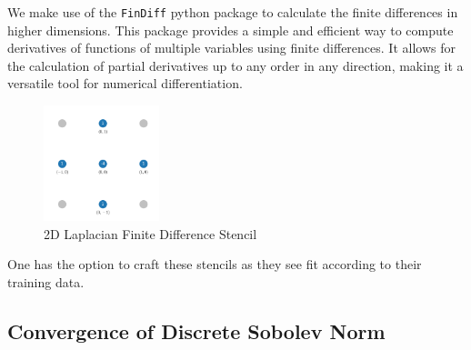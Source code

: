 \documentclass[11pt,a4paper]{article}
\theoremstyle{plain}
\newtheorem{proposition}[theorem]{Proposition}
\theoremstyle{definition}
\theoremstyle{remark}
\begin{document}
We make use of the \verb|FinDiff| python package to calculate the finite differences in higher dimensions. This package provides a simple and efficient way to compute derivatives of functions of multiple variables using finite differences. It allows for the calculation of partial derivatives up to any order in any direction, making it a versatile tool for numerical differentiation. \cite{FinDiff}

\begin{figure}[h]
    \centering
    \includegraphics[width=0.3\textwidth]{diags/laplace2d.png}
    \caption{2D Laplacian Finite Difference Stencil}
\end{figure}

One has the option to craft these stencils as they see fit according to their training data.


\subsection{Convergence of Discrete Sobolev Norm}


\end{document}
